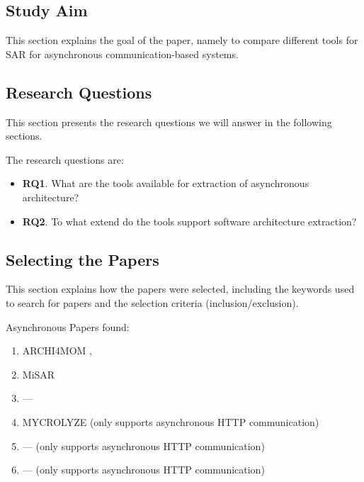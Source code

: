 \subsection{Study Aim}
\label{sec:StudyDesign:StudyAim}
This section explains the goal of the paper, namely to compare different tools for SAR for asynchronous communication-based systems.

\subsection{Research Questions}
\label{sec:StudyDesign:ResearchQuestions}
This section presents the research questions we will answer in the following sections.

The research questions are: \\
\begin{itemize}
	\item \textbf{RQ1}. What are the tools available for extraction of asynchronous architecture?
	\item \textbf{RQ2}. To what extend do the tools support software architecture extraction?
\end{itemize}

\subsection{Selecting the Papers}
\label{sec:StudyDesign:SelectingPapers}
This section explains how the papers were selected, including the keywords used to search for papers and the selection criteria (inclusion/exclusion).

Asynchronous Papers found:
\begin{enumerate}
	\item ARCHI4MOM \cite{Singh2022ARCHI4MOM}, \cite{Singh2021}
	\item MiSAR \cite{Alshuqayran2018MiSAR}
	\item --- \cite{Brosig2011}
	\item MYCROLYZE \cite{Kleehaus2018} (only supports asynchronous HTTP communication)
	\item --- \cite{Mayer2018} (only supports asynchronous HTTP communication)
	\item --- \cite{Ntentos2021} (only supports asynchronous HTTP communication)
\end{enumerate}

